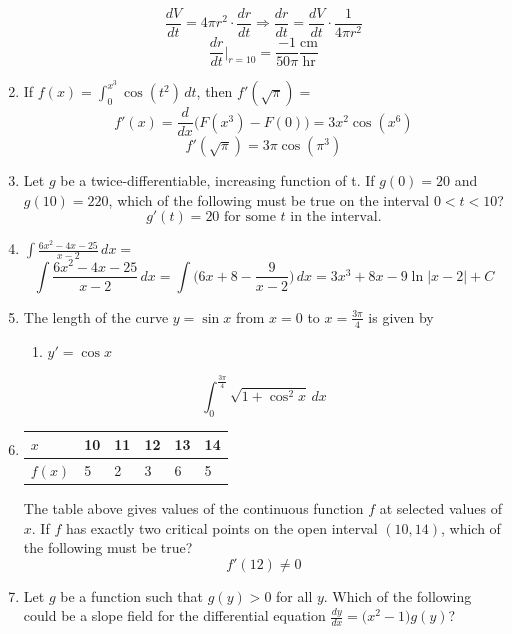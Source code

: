 \documentclass[12pt]{article}
\begin{document}
\begin{enumerate}
\begin{enumerate}
    \end{enumerate}
    $$\frac{dV}{dt} = 4\pi r^2 \cdot \frac{dr}{dt} \Longrightarrow  \frac{dr}{dt}=\frac{dV}{dt} \cdot \frac{1}{4\pi r^2}$$
    $$\frac{dr}{dt}\bigg\rvert_{r=10} = \boxed{\frac{-1}{50\pi} \frac{\text{cm}}{{\text{hr}}}}$$
    \item If $f(x)=\int_{0}^{x^3} \cos(t^2)\,dt$, then $f'(\sqrt{\pi})=$
    $$f'(x)=\frac{d}{dx}\biggr(F(x^3)-F(0)\biggr) = 3x^2\cos(x^6)$$
    $$\boxed{f'(\sqrt{\pi}) = 3\pi \cos (\pi^3)}$$
    \item Let $g$ be a twice-differentiable, increasing function of t. If $g(0) = 20$ and $g(10) = 220$, which of the following must be true on the interval $0 < t < 10$?
    $$\boxed{g'(t) = 20 \text{ for some $t$ in the interval.}}$$
    \item $\int \frac{6x^2-4x-25}{x-2} \, dx = $
    $$\int \frac{6x^2-4x-25}{x-2} \, dx = \int \biggr(6x+8 -\frac{9}{x-2}\bigg) \, dx = 3x^3+8x -9\ln|x-2|+C$$
    \item The length of the curve  $y = \sin x$ from $x = 0$ to $x = \frac{3\pi}{4}$ is given by
    \begin{enumerate}
        \item $y' = \cos x$
    \end{enumerate}
    $$\boxed{\int_{0}^{\frac{3\pi}{4}} \sqrt{1+\cos^2 x} \, dx}$$
    \item 
    \begin{table}[h!]
        \centering
        \begin{tabular}{|l||l|l|l|l|l|}
        \hline
        $x$    & 10 & 11 & 12 & 13 & 14 \\ \hline
        $f(x)$ & 5  & 2  & 3  & 6  & 5  \\ \hline
        \end{tabular}
        \end{table}
    The table above gives values of the continuous function $f$ at selected values of $x$. If $f$ has exactly two critical points on the open interval $(10, 14)$, which of the following must be true?
    $$\boxed{f'(12) \neq 0}$$
    \item Let $g$ be a function such that $g(y) > 0$  for all $y$. Which of the following could be a slope field for the differential equation $\frac{dy}{dx}=\big(x^2-1\big)g(y)$?
    \begin{center}

\end{center}
\end{enumerate}
\end{document}

